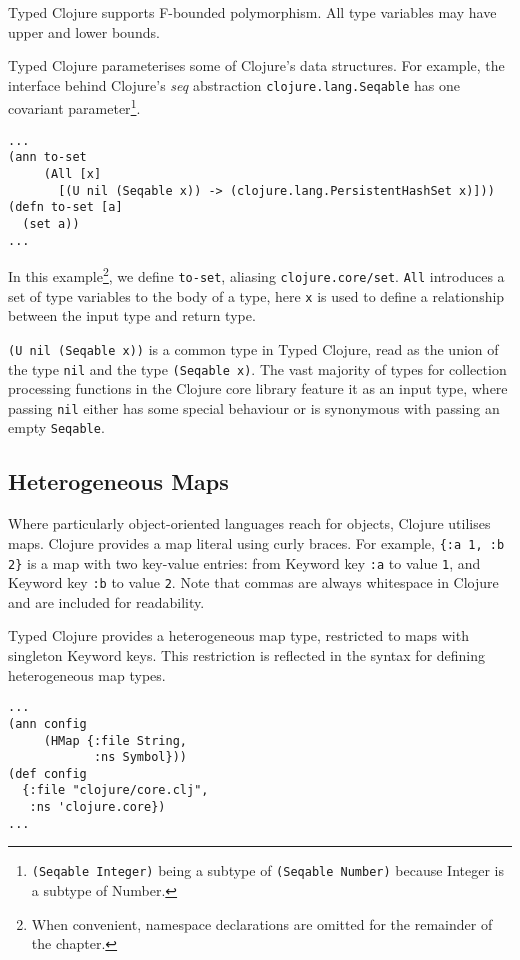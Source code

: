 Typed Clojure supports F-bounded polymorphism. All type variables may have
upper and lower bounds.

Typed Clojure parameterises some of Clojure's data structures. For example,
the interface behind Clojure's \emph{seq} abstraction \lstinline|clojure.lang.Seqable| has one 
covariant parameter\footnote{\lstinline|(Seqable Integer)| being a subtype of \lstinline|(Seqable Number)|
because Integer is a subtype of Number.}.

\begin{lstlisting}[caption=Polymorphism in Typed Clojure]
...
(ann to-set 
     (All [x]
       [(U nil (Seqable x)) -> (clojure.lang.PersistentHashSet x)]))
(defn to-set [a]
  (set a))
...
\end{lstlisting}

In this example\footnote{When convenient, namespace declarations are omitted for the remainder of the chapter.}, 
we define \lstinline|to-set|, aliasing \lstinline|clojure.core/set|.
\lstinline|All| introduces a set of type variables to the body of a type,
here \lstinline|x| is used to define a relationship between the input type and return type.

\lstinline|(U nil (Seqable x))| is a common type in Typed Clojure, read as the union
of the type \lstinline|nil| and the type \lstinline|(Seqable x)|.
The vast majority of types for collection processing functions in the Clojure core library feature
it as an input type, where passing \lstinline|nil| either has some special behaviour 
or is synonymous with passing an empty \lstinline|Seqable|.

\subsection{Heterogeneous Maps}

Where particularly object-oriented languages reach for objects, Clojure
utilises maps. Clojure provides a map literal using curly braces. For example,
\lstinline|{:a 1, :b 2}| is a map with two key-value entries: from Keyword key \lstinline|:a|
to value \lstinline|1|, and Keyword key \lstinline|:b| to value \lstinline|2|. Note that commas are always
whitespace in Clojure and are included for readability.

Typed Clojure provides a heterogeneous map type, restricted to 
maps with singleton Keyword keys. This restriction is reflected
in the syntax for defining heterogeneous map types.

\begin{lstlisting}[caption=Heterogeneous map types in Typed Clojure]
...
(ann config
     (HMap {:file String,
            :ns Symbol}))
(def config
  {:file "clojure/core.clj",
   :ns 'clojure.core})
...
\end{lstlisting}

